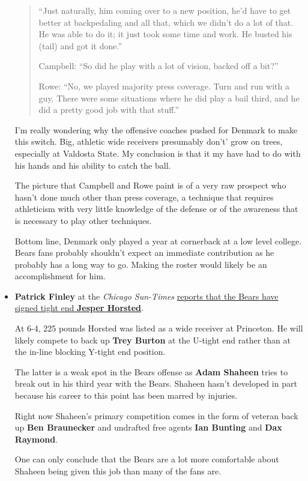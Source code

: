 \documentclass[11pt]{article}
\begin{document}
\begin{itemize}
\begin{quote}
``Just naturally, him coming over to a new position, he’d have to get better at backpedaling and all that, which we didn’t do a lot of that. He was able to do it; it just took some time and work. He busted his (tail) and got it done.''

Campbell:  ``So did he play with a lot of vision, backed off a bit?''

Rowe:  ``No, we played majority press coverage. Turn and run with a guy. There were some situations where he did play a bail third, and he did a pretty good job with that stuff.''
\end{quote}

I'm really wondering why the offensive coaches pushed for Denmark to make this switch.  Big, athletic wide receivers presumably don't' grow on trees, especially at Valdosta State.  My conclusion is that it my have had to do with his hands and his ability to catch the ball.

The picture that Campbell and Rowe paint is of a very raw prospect who hasn't done much other than press coverage, a technique that requires athleticism with very little knowledge of the defense or of the awareness that is necessary to play other techniques.

Bottom line, Denmark only played a year at cornerback at a low level college.  Bears fans probably shouldn't expect an immediate contribution as he probably has a long way to go.  Making the roster would likely be an accomplishment for him.

\item \textbf{Patrick Finley} at the \textit{Chicago Sun-Times} \href{https://chicago.suntimes.com/sports/bears-jesper-horsted-sign-undrafted-free-agent/}{reports that the Bears have signed tight end \textbf{Jesper Horsted}}.

At 6-4, 225 pounds Horsted was listed as a wide receiver at Princeton.  He will likely compete to back up \textbf{Trey Burton} at the U-tight end rather than at the in-line blocking Y-tight end position.

The latter is a weak spot in the Bears offense as \textbf{Adam Shaheen} tries to break out in his third year with the Bears.  Shaheen hasn't developed in part because his career to this point has been marred by injuries.

Right now Shaheen's primary competition comes in the form of veteran back up \textbf{Ben Braunecker} and undrafted free agents \textbf{Ian Bunting} and \textbf{Dax Raymond}.

One can only conclude that the Bears are a lot more comfortable about Shaheen being given this job than many of the fans are.


\end{itemize}
\end{document}

